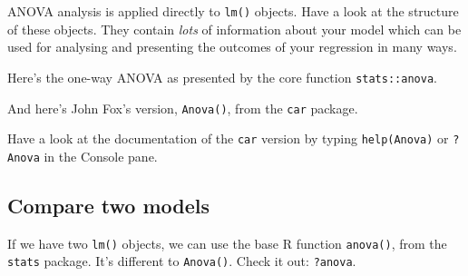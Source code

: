 \documentclass[titlepage]{book}\usepackage{knitr}
\begin{document}
ANOVA analysis is applied directly to \texttt{lm()} objects. Have a look at the structure of these objects. They contain \emph{lots} of information about your model which can be used for analysing and presenting the outcomes of your regression in many ways.

\begin{knitrout}
\color{fgcolor}\begin{kframe}
\begin{alltt}
\end{alltt}
\end{kframe}
\end{knitrout}

Here's the one-way ANOVA as presented by the core function \texttt{stats::anova}.

\begin{knitrout}
\color{fgcolor}\begin{kframe}
\begin{alltt}
\end{alltt}
\end{kframe}
\end{knitrout}

And here's John Fox's version, \texttt{Anova()}, from the \texttt{car} package.

\begin{knitrout}
\color{fgcolor}\begin{kframe}
\begin{alltt}
 \hlstd{=}\hlstd{)}
\end{alltt}
\end{kframe}
\end{knitrout}

Have a look at the documentation of the \texttt{car} version by typing \texttt{help(Anova)} or \texttt{?Anova} in the Console pane.

\subsection{Compare two models}

If we have two \texttt{lm()} objects, we can use the base R function \texttt{anova()}, from the \texttt{stats} package. It's different to \texttt{Anova()}.  Check it out: \texttt{?anova}.
\end{document}
